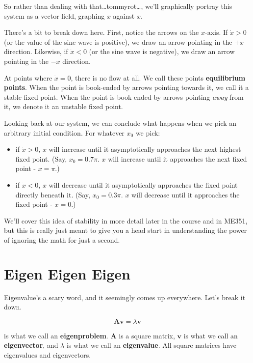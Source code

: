 \documentclass[
  letterpaper,
  DIV=11,
  numbers=noendperiod]{scrreprt}
\providecommand{\tightlist}{%
  \setlength{\itemsep}{0pt}\setlength{\parskip}{0pt}}\usepackage{longtable,booktabs,array}
\begin{document}
So rather than dealing with that\ldots tommyrot\ldots, we'll graphically
portray this system as a vector field, graphing \(\dot{x}\) against
\(x\).

There's a bit to break down here. First, notice the arrows on the
\(x\)-axis. If \(\dot{x} > 0\) (or the value of the sine wave is
positive), we draw an arrow pointing in the \(+x\) direction. Likewise,
if \(\dot{x} < 0\) (or the sine wave is negative), we draw an arrow
pointing in the \(-x\) direction.

At points where \(\dot{x} = 0\), there is no flow at all. We call these
points \textbf{equilibrium points}. When the point is book-ended by
arrows pointing towards it, we call it a stable fixed point. When the
point is book-ended by arrows pointing \emph{away} from it, we denote it
an unstable fixed point.

Looking back at our system, we can conclude what happens when we pick an
arbitrary initial condition. For whatever \(x_0\) we pick:

\begin{itemize}
\tightlist
\item
  if \(\dot{x} > 0\), \(x\) will increase until it asymptotically
  approaches the next highest fixed point. (Say, \(x_0 = 0.7 \pi\).
  \(x\) will increase until it approaches the next fixed point -
  \(x = \pi\).)
\item
  if \(\dot{x} < 0\), \(x\) will decrease until it asymptotically
  approaches the fixed point directly beneath it. (Say,
  \(x_0 = 0.3 \pi\). \(x\) will decrease until it approaches the fixed
  point - \(x = 0\).)
\end{itemize}

We'll cover this idea of stability in more detail later in the course
and in ME351, but this is really just meant to give you a head start in
understanding the power of ignoring the math for just a second.

\hypertarget{eigen-eigen-eigen}{%
\section{Eigen Eigen Eigen}\label{eigen-eigen-eigen}}

Eigenvalue's a scary word, and it seemingly comes up everywhere. Let's
break it down.

\[\textbf{A} \boldsymbol{v} = \lambda \boldsymbol{v}\]

is what we call an \textbf{eigenproblem}. \(\textbf{A}\) is a square
matrix, \(\boldsymbol{v}\) is what we call an \textbf{eigenvector}, and
\(\lambda\) is what we call an \textbf{eigenvalue}. All square matrices
have eigenvalues and eigenvectors.
\end{document}
